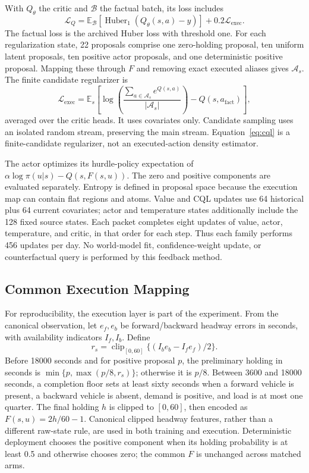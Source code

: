 \documentclass[journal]{IEEEtran}
\newcommand{\E}{\mathbb{E}}
\begin{document}
With $Q_\theta$ the critic and $\mathcal B$ the factual batch, its loss includes
\begin{equation}
 \mathcal L_Q=\E_{\mathcal B}[\operatorname{Huber}_{1}(Q_\theta(s,a)-y)]
                 +0.2\mathcal L_{\mathrm{exec}}. \label{eq:critic}
\end{equation}
The factual loss is the archived Huber loss with threshold one. For each regularization state, 22 proposals comprise one zero-holding proposal, ten uniform latent proposals, ten positive actor proposals, and one deterministic positive proposal. Mapping these through $F$ and removing exact executed aliases gives $\mathcal A_s$. The finite candidate regularizer is
\begin{equation}
 \mathcal L_{\mathrm{exec}}=
 \E_s\!\left[\log\!\left(\frac{\sum_{a\in\mathcal A_s}e^{Q(s,a)}}{|\mathcal A_s|}\right)
                   -Q(s,a_{\mathrm{fact}})\right], \label{eq:cql}
\end{equation}
averaged over the critic heads. It uses covariates only. Candidate sampling uses an isolated random stream, preserving the main stream. Equation~\eqref{eq:cql} is a finite-candidate regularizer, not an executed-action density estimator.

The actor optimizes its hurdle-policy expectation of $\alpha\log\pi(u|s)-Q(s,F(s,u))$. The zero and positive components are evaluated separately. Entropy is defined in proposal space because the execution map can contain flat regions and atoms. Value and CQL updates use 64 historical plus 64 current covariates; actor and temperature states additionally include the 128 fixed source states. Each packet completes eight updates of value, actor, temperature, and critic, in that order for each step. Thus each family performs 456 updates per day. No world-model fit, confidence-weight update, or counterfactual query is performed by this feedback method.

\subsection{Common Execution Mapping}
For reproducibility, the execution layer is part of the experiment. From the canonical observation, let $e_f,e_b$ be forward/backward headway errors in seconds, with availability indicators $I_f,I_b$. Define
\begin{equation}
 r_s=\operatorname{clip}_{[0,60]}\{(I_be_b-I_fe_f)/2\}.
\end{equation}
Before 18000 seconds and for positive proposal $p$, the preliminary holding in seconds is $\min\{p,\max(p/8,r_s)\}$; otherwise it is $p/8$. Between 3600 and 18000 seconds, a completion floor sets at least sixty seconds when a forward vehicle is present, a backward vehicle is absent, demand is positive, and load is at most one quarter. The final holding $h$ is clipped to $[0,60]$, then encoded as $F(s,u)=2h/60-1$. Canonical clipped headway features, rather than a different raw-state rule, are used in both training and execution. Deterministic deployment chooses the positive component when its holding probability is at least 0.5 and otherwise chooses zero; the common $F$ is unchanged across matched arms.
\end{document}
